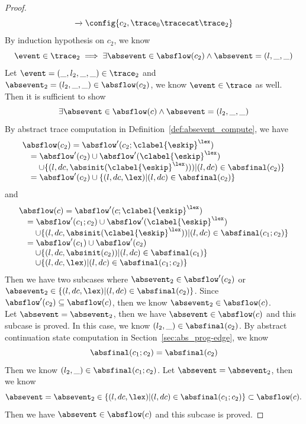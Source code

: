 \begin{proof}
\[{    \xrightarrow{} 
    \config{{c_2, \trace_0 \tracecat \trace_2}}
    }
  \]
  By induction hypothesis on $c_2$, we know 
  \[
    \event \in \trace_2
    \implies
    \exists 
    \absevent \in \absflow(c_2) \land \absevent = (l, \_, \_) 
  \]
  Let $\event = (\_, l_2, \_, \_) \in \trace_2$ and $\absevent_2 = (l_2, \_, \_) \in \absflow(c_2)$, we know $\event \in \trace$ as well.
  Then it is sufficient to show
  \[
    \exists 
    \absevent \in \absflow(c) \land  \absevent = (l_2, \_, \_)
  \]
  By abstract trace computation in Definition~\ref{def:absevent_compute}, we have
  \[
    \begin{array}{l}
      \absflow(c_2) = \absflow'(c_2; \clabel{\eskip}^{\lex}) 
      \\ \quad
      = \absflow'(c_2) \cup \absflow'(\clabel{\eskip}^{\lex}) 
      \\ \qquad
      \cup \{ (l, dc, \absinit(\clabel{\eskip}^{\lex}))) | (l, dc) \in \absfinal(c_2) \} 
      \\ \quad
      = \absflow'(c_2) \cup  \{ (l, dc, \lex) | (l, dc) \in \absfinal(c_2) \} 
   \end{array}
  \]  
  and 
  \[
    \begin{array}{l}
      \absflow(c) = \absflow'(c; \clabel{\eskip}^{\lex}) 
      \\ \quad
      = \absflow'(c_1;c_2) \cup \absflow'(\clabel{\eskip}^{\lex}) 
      \\ \qquad
      \cup \{ (l, dc, \absinit(\clabel{\eskip}^{\lex})) | (l, dc) \in \absfinal(c_1; c_2) \} 
      \\ \quad  
      = \absflow'(c_1) \cup \absflow'(c_2) 
      \\ \quad \quad
      \cup \{ (l, dc, \absinit(c_2)) | (l, dc) \in \absfinal(c_1) \} 
      \\ \quad \quad
      \cup \{ (l, dc, \lex) | (l, dc) \in \absfinal(c_1; c_2) \} 
   \end{array}
  \]
  Then we have two subcases where 
  $\absevent_2 \in \absflow'(c_2)$ or $\absevent_2 \in \{ (l, dc, \lex) | (l, dc) \in \absfinal(c_2) \}$.
  Since $\absflow'(c_2) \subseteq \absflow(c)$, then we know $\absevent_2 \in \absflow(c)$.
  \\
  Let $\absevent = \absevent_2$, then we have $\absevent \in \absflow(c)$ and this subcase is proved.
  In this case, we know $(l_2, \_) \in \absfinal(c_2)$. By abstract continuation state computation in Section~\ref{sec:abs_prog-edge}, we know
  \[
    \absfinal(c_1; c_2) =  \absfinal(c_2) 
  \]
  Then we know $(l_2, \_) \in \absfinal(c_1; c_2)$. Let $\absevent = \absevent_2$, then we know 
  \[
    \absevent = \absevent_2 \in   \{ (l, dc, \lex) | (l, dc) \in \absfinal(c_1; c_2) \}  \subset\absflow(c).
  \]
  Then we have $\absevent \in \absflow(c)$ and this subcase is proved.
  \end{proof}


